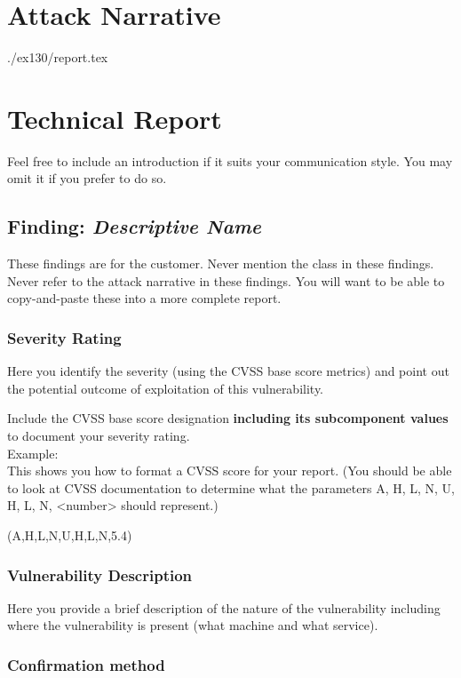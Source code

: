 \section{Attack Narrative}
./ex130/report.tex

\section{Technical Report}

Feel free to include an introduction if it suits your communication style.
You may omit it if you prefer to do so.


  \subsection{Finding: \emph{Descriptive Name}}
  
    These findings are for the customer.
    Never mention the class in these findings.
    Never refer to the attack narrative in these findings.
    You will want to be able to copy-and-paste these into a more complete report.

	\subsubsection*{Severity Rating}
		Here you identify the severity (using the CVSS base score metrics)
		and point out the potential outcome of exploitation of this
		vulnerability.

		Include the CVSS base score designation \textbf{including its
		subcomponent values} to document your	severity rating.\\
		Example: \\
	   	This shows you how to format a CVSS score for your report.
	   	(You should be able to look at CVSS documentation to
	   	determine what the parameters A, H, L, N, U, H, L, N,
	   	<number> should represent.)
	   	
	    
		\cvss(A,H,L,N,U,H,L,N,5.4)
		
  	\subsubsection*{Vulnerability Description}
  		Here you provide a brief description of the nature of the vulnerability
  		including where the vulnerability is present (what machine and
  		what service).
  		
  	\subsubsection*{Confirmation method}
  	
